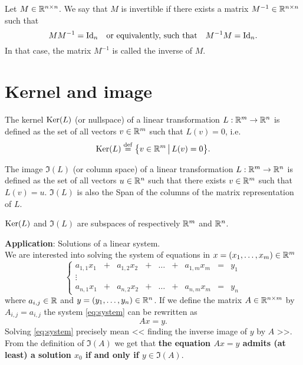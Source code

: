 \documentclass[11pt,nocut]{article}
\begin{document}
\begin{definition}
	Let $M \in \mathbb{R}^{n \times n}$. We say that $M$ is invertible if there exists a matrix $M^{-1} \in \mathbb{R}^{n \times n}$ such that 
	$$
	M M^{-1} = {{\rm Id}}_n \quad \text{or equivalently, such that} \quad M^{-1} M = {{\rm Id}}_n.
	$$
	In that case, the matrix $M^{-1}$ is called the inverse of $M$.
\end{definition}

\section{Kernel and image}

\begin{definition}[Kernel]
	The kernel ${{\rm Ker}}(L)$ (or nullspace) of a linear transformation $L: \mathbb{R}^m \to \mathbb{R}^n$ is defined as the set of all vectors $v \in \mathbb{R}^m$ such that $L(v) = 0$, i.e.
	$$
	{{\rm Ker}}(L) \overset{\rm def}{=} \big\{ v \in \mathbb{R}^m \, \big| \, L(v) = 0 \big\}.
	$$
\end{definition}

\begin{definition}[Image]
	The image $\Im(L)$ (or column space) of a linear transformation $L: \mathbb{R}^m \to \mathbb{R}^n$ is defined as the set of all vectors $u \in \mathbb{R}^n$ such that there exists $v \in \mathbb{R}^m$ such that $L(v) = u$. 
	$\Im(L)$ is also the Span of the columns of the matrix representation of $L$.
\end{definition}

\begin{proposition}
	${{\rm Ker}}(L)$ and $\Im(L)$ are subspaces of respectively $\mathbb{R}^m$ and $\mathbb{R}^n$.
\end{proposition}
\vspace{1cm}

\noindent
\textbf{Application}: Solutions of a linear system.
\\

We are interested into solving the system of equations in $x = (x_1, \dots, x_m) \in \mathbb{R}^m$
\begin{equation}\label{eq:system}
	\left\{
		\begin{array}{ccccccccc}
		a_{1,1} x_1 &+& a_{1,2} x_2 &+& \dots &+& a_{1,m} x_m &=& y_1 \\
		\vdots &&&&&&&& \\
		a_{n,1} x_1 &+& a_{n,2} x_2 &+& \dots &+& a_{n,m} x_m &=& y_n
	\end{array}
	\right.
\end{equation}
where $a_{i,j} \in \mathbb{R}$ and $y = (y_1, \dots, y_n) \in \mathbb{R}^n$. If we define the matrix $A \in \mathbb{R}^{n \times m}$ by $A_{i,j} = a_{i,j}$ the system \eqref{eq:system} can be rewritten as
$$
A x = y.
$$
Solving \eqref{eq:system} precisely mean << finding the inverse image of $y$ by $A$ >>. From the definition of $\Im(A)$ we get that 
\textbf{the equation $Ax = y$ admits (at least) a solution $x_0$ if and only if $y \in \Im(A)$}.
\\
\end{document}
